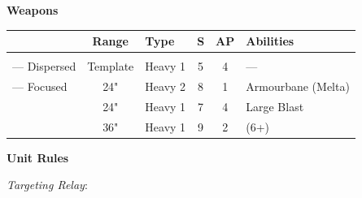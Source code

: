 \begin{minipage}[t]{0.72\textwidth}
	
	\vspace*{2em}
	\textbf{Weapons}
	
	\begin{tabular}{L{90 pt} c C{40pt} *{2}{c} >{\raggedright\arraybackslash}p{130pt}}
		& Range & Type & S & AP & Abilities \\
		\hline
		 &  &  & &  &  \\
		— Dispersed & Template & Heavy 1 & 5 & 4 & — \\
		— Focused & 24" & Heavy 2 & 8 & 1 & Armourbane (Melta) \\
		 & 24" & Heavy 1 & 7 & 4 & Large Blast \\
		 & 36" & Heavy 1 & 9 & 2 &  (6+) \\
	\end{tabular}
	
	\vspace*{2em}
	\textbf{Unit Rules}
	
	\textit{Targeting Relay}: 
\end{minipage}
